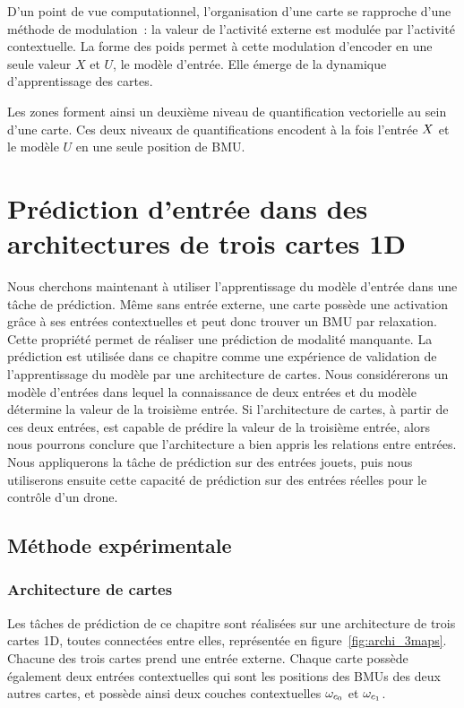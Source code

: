 \documentclass[../main]{subfiles}
\begin{document}
D'un point de vue computationnel, l'organisation d'une carte se rapproche d'une méthode de modulation~: la valeur de l'activité externe est modulée par l'activité contextuelle. 
La forme des poids permet à cette modulation d'encoder en une seule valeur $X$ et $U$, le modèle d'entrée. Elle émerge de la dynamique d'apprentissage des cartes.

Les zones forment ainsi un deuxième niveau de quantification vectorielle au sein d'une carte. 
Ces deux niveaux de quantifications encodent à la fois l'entrée $X$ et le modèle $U$ en une seule position de BMU.

\section{Prédiction d'entrée dans des architectures de trois cartes 1D}

Nous cherchons maintenant à utiliser l'apprentissage du modèle d'entrée dans une tâche de prédiction. Même sans entrée externe, une carte possède une activation grâce à ses entrées contextuelles et peut donc trouver un BMU par relaxation. Cette propriété permet de réaliser une prédiction de modalité manquante. 
La prédiction est utilisée dans ce chapitre comme une expérience de validation de l'apprentissage du modèle par une architecture de cartes.
Nous considérerons un modèle d'entrées dans lequel la connaissance de deux entrées et du modèle détermine la valeur de la troisième entrée. Si l'architecture de cartes, à partir de ces deux entrées, est capable de prédire la valeur de la troisième entrée, alors nous pourrons conclure que l'architecture a bien appris les relations entre entrées.
Nous appliquerons la tâche de prédiction sur des entrées jouets, puis nous utiliserons ensuite cette capacité de prédiction sur des entrées réelles pour le contrôle d'un drone.

\subsection{Méthode expérimentale}

\subsubsection{Architecture de cartes}

Les tâches de prédiction de ce chapitre sont réalisées sur une architecture de trois cartes 1D, toutes connectées entre elles, représentée en figure~\ref{fig:archi_3maps}. Chacune des trois cartes prend une entrée externe.
Chaque carte possède également deux entrées contextuelles qui sont les positions des BMUs des deux autres cartes, et possède ainsi deux couches contextuelles $\omega_{c_0}$ et $\omega_{c_1}$.
\end{document}
